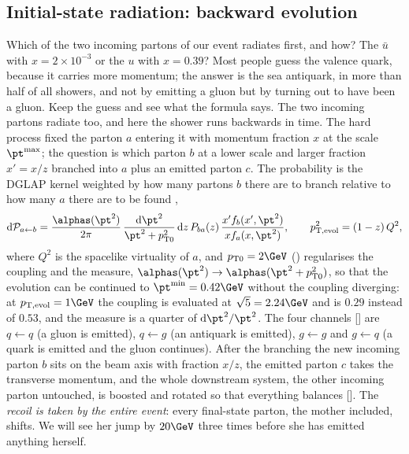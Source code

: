 \subsection{Initial-state radiation: backward evolution}
\label{sec:mother_gives_birth:isr}

Which of the two incoming partons of our event radiates first, and how? The
$\bar u$ with $x=2\times10^{-3}$ or the $u$ with $x=0.39$? Most people
guess the valence quark, because it carries more momentum; the answer is
the sea antiquark, in more than half of all showers, and not by emitting a
gluon but by turning out to have been a gluon. Keep the guess and see what
the formula says. The two incoming partons radiate too, and here the shower
runs backwards in time. The hard process fixed the parton $a$ entering it with momentum
fraction $x$ at the scale $\pt^{\max}$; the question is which parton $b$ at
a lower scale and larger fraction $x'=x/z$ branched into $a$ plus an emitted
parton $c$. The probability is the DGLAP kernel weighted by how many partons
$b$ there are to branch relative to how many $a$ there are to be found
\cite{Sjostrand:2004ef},
\begin{equation}
  \mathrm{d}\mathcal P_{a\leftarrow b}
  =\frac{\alphas(\pt^2)}{2\pi}\,
  \frac{\mathrm{d}\pt^2}{\pt^2+p_{\mathrm{T}0}^2}\,
  \mathrm{d}z\,P_{ba}(z)\,
  \frac{x'f_b(x',\pt^2)}{x f_a(x,\pt^2)},
  \qquad
  \ptevol^2=(1-z)\,Q^2 ,
  \label{eq:mother_gives_birth:isr}
\end{equation}
where $Q^2$ is the spacelike virtuality of $a$, and $p_{\mathrm{T}0}=2\GeV$
() regularises the coupling and the measure,
$\alphas(\pt^2)\to\alphas(\pt^2+p_{\mathrm{T}0}^2)$, so that the evolution can be
continued to $\pt^{\min}=0.42\GeV$ without the coupling diverging: at
$\ptevol=1\GeV$ the coupling is evaluated at $\sqrt5=2.24\GeV$ and is
$0.29$ instead of $0.53$, and the measure is a quarter of $\mathrm{d}\pt^2/\pt^2$. The
four channels [] are $q\leftarrow q$ (a gluon is
emitted), $q\leftarrow g$ (an antiquark is emitted), $g\leftarrow g$ and
$g\leftarrow q$ (a quark is emitted and the gluon continues). After the
branching the new incoming parton $b$ sits on the beam axis with fraction
$x/z$, the emitted parton $c$ takes the transverse momentum, and the whole
downstream system, the other incoming parton untouched, is boosted and
rotated so that everything balances []. The
\emph{recoil is taken by the entire event}: every final-state parton, the
mother included, shifts. We will see her \pt jump by $20\GeV$ three times
before she has emitted anything herself.

